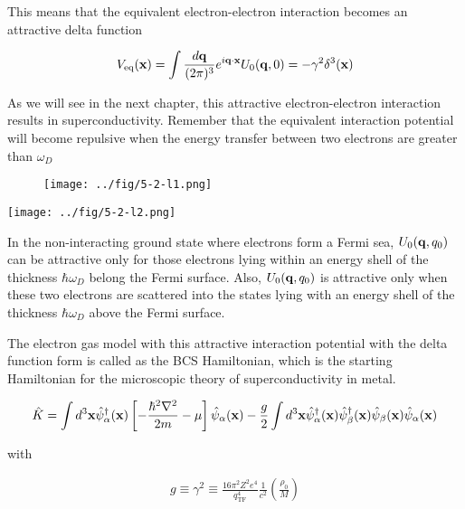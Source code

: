 This means that the equivalent electron-electron interaction becomes an attractive delta function

\[V_{\text{eq}}({\bf x}) = \int\frac{d\bf q}{(2\pi)^3}e^{i\bf q\cdot x}U_0({\bf q},0) = -\gamma^2\delta^3(\bf x) \]

As we will see in the next chapter, this attractive electron-electron interaction results in superconductivity. Remember that the equivalent interaction potential will become repulsive when the energy transfer between two electrons are greater than $\omega_D$

\begin{wrapfigure}{r}{5.5cm}
\texttt{[image: ../fig/5-2-l1.png]}
\end{wrapfigure}
\texttt{[image: ../fig/5-2-l2.png]}

In the non-interacting ground state where electrons form a Fermi sea, $U_0({\bf q},q_0)$ can be attractive only for those electrons lying within an energy shell of the thickness $\hbar\omega_D$ belong the Fermi surface. Also, $U_0({\bf q},q_0)$ is attractive only when these two electrons are scattered into the states lying with an energy shell of the thickness $\hbar\omega_D$ above the Fermi surface.

The electron gas model with this attractive interaction potential with the delta function form is called as the BCS Hamiltonian, which is the starting Hamiltonian for the microscopic theory of superconductivity in metal.

\[\hat{K} = \int d^3{\bf x}\hat{\psi}^\dagger_\alpha({\bf x})\left[-\frac{\hbar^2\nabla^2}{2m}-\mu\right]\hat{\psi}_\alpha({\bf x}) - \frac{g}{2}\int d^3{\bf x} \hat{\psi}^\dagger_\alpha({\bf x})\hat{\psi}^\dagger_\beta({\bf x})\hat{\psi}_\beta({\bf x})\hat{\psi}_\alpha({\bf x})\]

with

\begin{align}\tag{C}
g\equiv\gamma^2\equiv\frac{16\pi^2 Z^2 e^4}{q_{\text{TF}}^4}\frac{1}{c^2}\left(\frac{\rho_0}{M}\right) \end{align}
